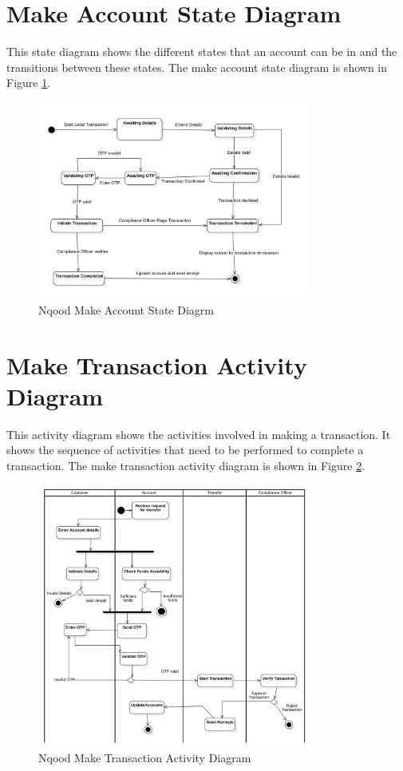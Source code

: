 \documentclass[a4paper]{report}
\begin{document}
\newpage

\section{Make Account State Diagram}

This state diagram shows the different states that an account can be in and the transitions between these states. The make account state diagram is shown in Figure \ref{fig:nqood-make-account-state-diagram}.

\begin{figure}[h!]
    \centering
    \includegraphics[width=0.8\textwidth]{images/nqood-account-tx-state-diagram.png}
    \caption{Nqood Make Account State Diagrm}
    \label{fig:nqood-make-account-state-diagram}
\end{figure}

\newpage

\section{Make Transaction Activity Diagram}

This activity diagram shows the activities involved in making a transaction. It shows the sequence of activities that need to be performed to complete a transaction. The make transaction activity diagram is shown in Figure \ref{fig:nqood-make-transaction-activity-diagram}.

\begin{figure}[h!]
    \centering
    \includegraphics[width=0.8\textwidth]{images/nqood-make-tx-activity-diagram.png}
    \caption{Nqood Make Transaction Activity Diagram}
    \label{fig:nqood-make-transaction-activity-diagram}
\end{figure}
\end{document}

